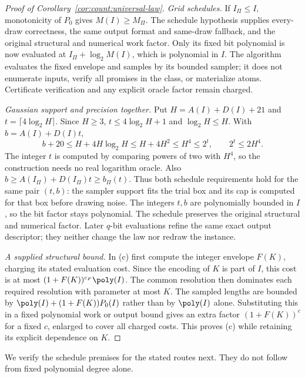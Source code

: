 \begin{proof}[Proof of Corollary~\ref{cor:count:universal-law}]
\emph{Grid schedules.} If $I_\Pi\le I$, monotonicity of $P_0$ gives
$M(I)\ge M_\Pi$. The schedule hypothesis supplies every-draw correctness,
the same output format and same-draw fallback, and the original structural
and numerical work factor. Only its fixed bit polynomial is now evaluated
at $I_\Pi+\log_2M(I)$, which is polynomial in $I$. The algorithm evaluates
the fixed envelope and samples by its bounded sampler; it does not
enumerate inputs, verify all promises in the class, or materialize atoms.
Certificate verification and any explicit oracle factor remain charged.

\emph{Gaussian support and precision together.} Put $H=A(I)+D(I)+21$
and $t=\lceil4\log_2H\rceil$. Since $H\ge3$,
$t\le4\log_2H+1$ and $\log_2H\le H$. With $b=A(I)+D(I)t$,
\[
 b+20\le H+4H\log_2H\le H+4H^2\le H^4\le2^t,
 \qquad 2^t\le2H^4.
\]
The integer $t$ is computed by comparing powers of two with $H^4$,
so the construction needs no real logarithm oracle.
Also $b\ge A(I_\Pi)+D(I_\Pi)t\ge b_\Pi(t)$. Thus both schedule
requirements hold for the same pair $(t,b)$: the sampler support fits the
trial box and its cap is computed for that box before drawing noise. The
integers $t,b$ are polynomially bounded in $I$, so the bit factor stays
polynomial. The schedule preserves the original structural and numerical
factor. Later $q$-bit evaluations refine the same exact output descriptor;
they neither change the law nor redraw the instance.

\emph{A supplied structural bound.} In (c) first compute the integer
envelope $F(K)$, charging its stated evaluation cost. Since the encoding
of $K$ is part of $I$, this cost is at most
$(1+F(K))^{c_F}\poly(I)$. The common resolution then dominates
each required resolution with parameter at most $K$. The sampled lengths
are bounded by $\poly(I)+(1+F(K))P_0(I)$ rather than by $\poly(I)$ alone.
Substituting this in a fixed polynomial work or output bound gives an
extra factor $(1+F(K))^c$ for a fixed $c$, enlarged to cover all charged
costs. This proves (c) while retaining its explicit dependence on $K$.
\end{proof}

We verify the schedule premises for the stated routes next. They do not
follow from fixed polynomial degree alone.

